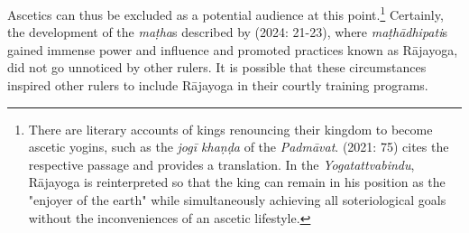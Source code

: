 Ascetics can thus be excluded as a potential audience at this point.\footnote{There are literary accounts of kings renouncing their kingdom to become ascetic yogins, such as the \textit{jogī khaṇḍa} of the \emph{Padmāvat}\nocite{jayasi1998}. \citeauthor{mallinson2021} (2021: 75) cites the respective passage and provides a translation. In the \emph{Yogatattvabindu}, Rājayoga is reinterpreted so that the king can remain in his position as the "enjoyer of the earth" while simultaneously achieving all soteriological goals without the inconveniences of an ascetic lifestyle.} Certainly, the development of the \textit{maṭha}s described by \citeauthor{datta2024} (2024: 21-23), where \textit{maṭhādhipati}s gained immense power and influence and promoted practices known as Rājayoga, did not go unnoticed by other rulers. It is possible that these circumstances inspired other rulers to include Rājayoga in their courtly training programs.

